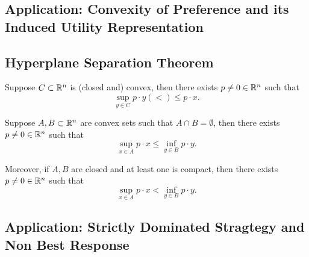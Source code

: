 \subsection{Application: Convexity of Preference and its Induced Utility Representation}


\subsection{Hyperplane Separation Theorem}
\begin{theorem}
    Suppose $C\subset \mathbb{R}^n$ is (closed and) convex, then there exists $p\neq 0 \in \mathbb{R}^n$ such that $$\sup_{y\in C} p\cdot y (<) \leq p\cdot x. $$
\end{theorem}

\begin{theorem}
    Suppose $A,B\subset \mathbb{R}^n$ are convex sets such that $A\cap B = \emptyset$, then there exists $p\neq 0 \in \mathbb{R}^n$ such that $$\sup_{x\in A} p\cdot x \leq \inf_{y\in B} p\cdot y. $$

    Moreover, if $A,B$ are closed and at least one is compact, then there exists $p\neq 0 \in \mathbb{R}^n$ such that $$\sup_{x\in A} p\cdot x < \inf_{y\in B} p\cdot y. $$
\end{theorem}

\subsection{Application: Strictly Dominated Stragtegy and Non Best Response}